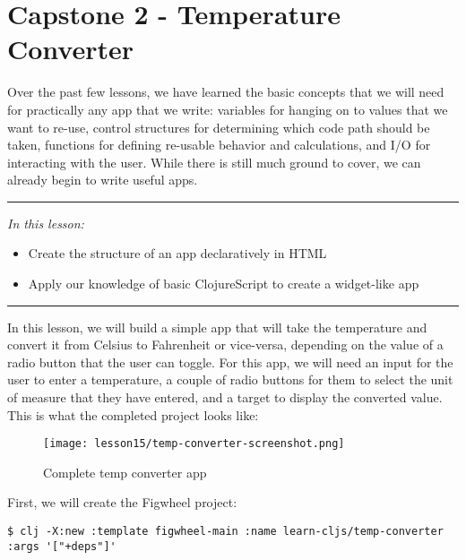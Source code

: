\documentclass[10pt,twoside,openright]{memoir}
\begin{document}
\chapter{Capstone 2 - Temperature Converter}

Over the past few lessons, we have learned the basic concepts that we
will need for practically any app that we write: variables for hanging
on to values that we want to re-use, control structures for determining
which code path should be taken, functions for defining re-usable
behavior and calculations, and I/O for interacting with the user. While
there is still much ground to cover, we can already begin to write
useful apps.

\begin{center}\rule{0.5\linewidth}{0.5pt}\end{center}

\emph{In this lesson:}

\begin{itemize}
\tightlist
\item
  Create the structure of an app declaratively in HTML
\item
  Apply our knowledge of basic ClojureScript to create a widget-like app
\end{itemize}

\begin{center}\rule{0.5\linewidth}{0.5pt}\end{center}

In this lesson, we will build a simple app that will take the
temperature and convert it from Celsius to Fahrenheit or vice-versa,
depending on the value of a radio button that the user can toggle. For
this app, we will need an input for the user to enter a temperature, a
couple of radio buttons for them to select the unit of measure that they
have entered, and a target to display the converted value. This is what
the completed project looks like:

\begin{figure}[H]
\caption{Complete temp converter app}
\centering
\texttt{[image: lesson15/temp-converter-screenshot.png]}
\end{figure}

First, we will create the Figwheel project:

\begin{verbatim}
$ clj -X:new :template figwheel-main :name learn-cljs/temp-converter :args '["+deps"]'
\end{verbatim}
\end{document}

